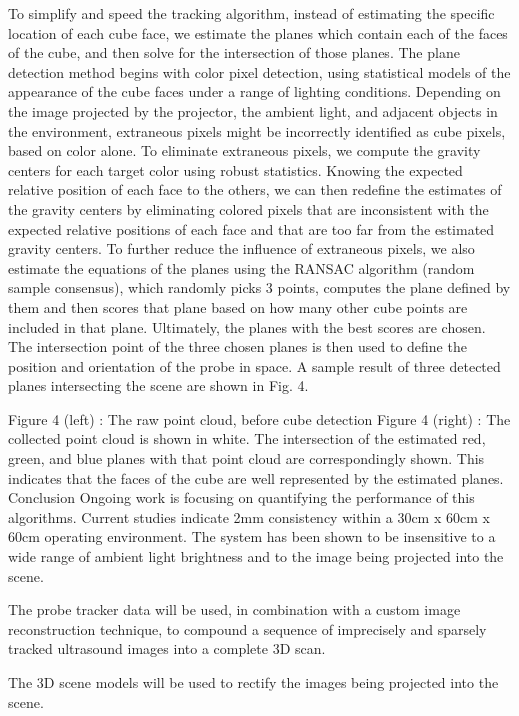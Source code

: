 \documentclass{llncs}
\begin{document}
To simplify and speed the tracking algorithm, instead of estimating the specific location of each cube face, we estimate the planes which contain each of the faces of the cube, and then solve for the intersection of those planes. The plane detection method begins with color pixel detection, using statistical models of the appearance of the cube faces under a range of lighting conditions.  Depending on the image projected by the projector, the ambient light, and adjacent objects in the environment, extraneous pixels might be incorrectly identified as cube pixels, based on color alone. To eliminate extraneous pixels, we compute the gravity centers for each target color using robust statistics. Knowing the expected relative position of each face to the others, we can then redefine the estimates of the gravity centers by eliminating colored pixels that are inconsistent with the expected relative positions of each face and that are too far from the estimated gravity centers.  To further reduce the influence of extraneous pixels, we also estimate the equations of the planes using the RANSAC algorithm (random sample consensus), which randomly picks 3 points, computes the plane defined by them and then scores that plane based on how many other cube points are included in that plane.  Ultimately, the planes with the best scores are chosen.  The intersection point of the three chosen planes is then used to define the position and orientation of the probe in space.   A sample result of three detected planes intersecting the scene are shown in Fig. 4.
 

Figure 4 (left) : The raw point cloud, before cube detection
Figure 4 (right) : The collected point cloud is shown in white.  The intersection of the estimated red, green, and blue planes with that point cloud are correspondingly shown.  This indicates that the faces of the cube are well represented by the estimated planes.
Conclusion
Ongoing work is focusing on quantifying the performance of this algorithms.  Current studies indicate 2mm consistency within a 30cm x 60cm x 60cm operating environment.  The system has been shown to be insensitive to a wide range of ambient light brightness and to the image being projected into the scene.

The probe tracker data will be used, in combination with a custom image reconstruction technique, to compound a sequence of imprecisely and sparsely tracked ultrasound images into a complete 3D scan.

The 3D scene models will be used to rectify the images being projected into the scene.
\end{document}
